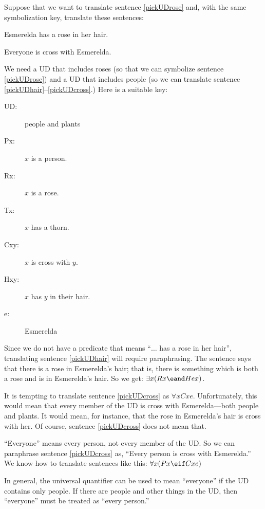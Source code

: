 Suppose that we want to translate sentence \ref{pickUDrose} and, with the same symbolization key, translate these sentences:

\begin{kormanize}
\item[\ex{pickUDhair}] Esmerelda has a rose in her hair.
\item[\ex{pickUDcross}] Everyone is cross with Esmerelda.
\end{kormanize}

We need a UD that includes roses (so that we can symbolize sentence \ref{pickUDrose}) and a UD that includes people (so we can translate sentence \ref{pickUDhair}--\ref{pickUDcross}.) Here is a suitable key:
\begin{description}
\item[UD:] people and plants
\item[Px:] $x$ is a person.
\item[Rx:] $x$ is a rose.
\item[Tx:] $x$ has a thorn.
\item[Cxy:] $x$ is cross with $y$.
\item[Hxy:] $x$ has $y$ in their hair.
\item[e:] Esmerelda
\end{description}

Since we do not have a predicate that means ``$\ldots$ has a rose in her hair'', translating sentence \ref{pickUDhair} will require paraphrasing. The sentence says that there is a rose in Esmerelda's hair; that is, there is something which is both a rose and is in Esmerelda's hair. So we get: $\exists x(Rx \eand Hex)$.

It is tempting to translate sentence \ref{pickUDcross} as $\forall x Cxe$. Unfortunately, this would mean that every member of the UD is cross with Esmerelda---both people and plants. It would mean, for instance, that the rose in Esmerelda's hair is cross with her. Of course, sentence \ref{pickUDcross} does not mean that.

``Everyone'' means every person, not every member of the UD. So we can paraphrase sentence \ref{pickUDcross} as, ``Every person is cross with Esmerelda.'' We know how to translate sentences like this: $\forall x(Px \eif Cxe)$

In general, the universal quantifier can be used to mean ``everyone'' if the UD contains only people. If there are people and other things in the UD, then ``everyone'' must be treated as ``every person.''


